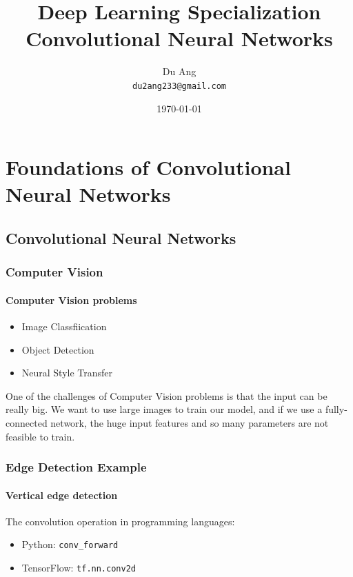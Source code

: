 \documentclass[UTF8]{article}
\title{Deep Learning Specialization \\
        Convolutional Neural Networks}
\author{Du Ang \\ \texttt{du2ang233@gmail.com} }
\date{\today}
\begin{document}
\maketitle

\tableofcontents
\newpage

\section{Foundations of Convolutional Neural Networks}
\subsection{Convolutional Neural Networks}
\subsubsection{Computer Vision}
\paragraph{Computer Vision problems}
\begin{itemize}
    \item Image Classfiication
    \item Object Detection
    \item Neural Style Transfer
\end{itemize}

One of the challenges of Computer Vision problems is that the input can be really big. We want to
use large images to train our model, and if we use a fully-connected network, the huge input
features and so many parameters are not feasible to train.

\subsubsection{Edge Detection Example}
\paragraph{Vertical edge detection}
The convolution operation in programming languages:
\begin{itemize}
    \item Python: \texttt{conv_forward}
    \item TensorFlow: \texttt{tf.nn.conv2d}
\end{itemize}
\end{document}
